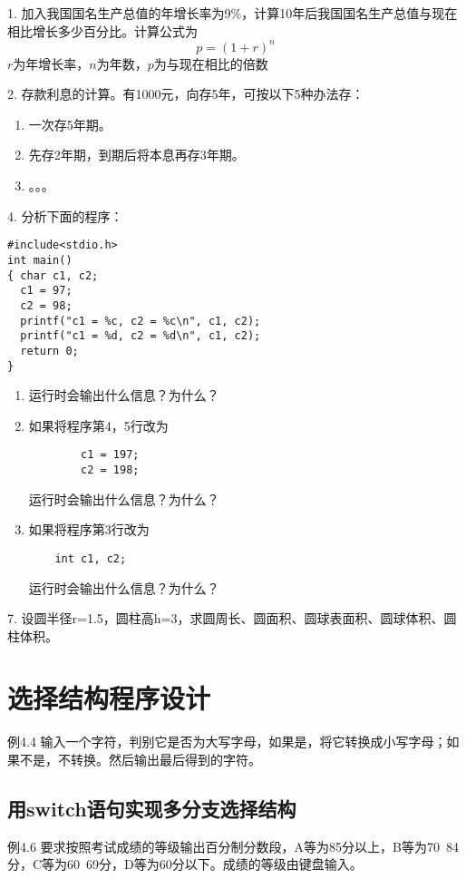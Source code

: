 1. 加入我国国名生产总值的年增长率为9\%，计算10年后我国国名生产总值与现在相比增长多少百分比。计算公式为
\begin{equation}
p = (1 + r) ^ n
\end{equation}
$r$为年增长率，$n$为年数，$p$为与现在相比的倍数

2. 存款利息的计算。有1000元，向存5年，可按以下5种办法存：
\begin{enumerate}
	\item 一次存5年期。
	\item 先存2年期，到期后将本息再存3年期。
	\item 。。。
\end{enumerate}

4. 分析下面的程序：
\begin{lstlisting}
#include<stdio.h>
int main()
{ char c1, c2;
  c1 = 97;
  c2 = 98;
  printf("c1 = %c, c2 = %c\n", c1, c2);
  printf("c1 = %d, c2 = %d\n", c1, c2);
  return 0;
}
\end{lstlisting}
\begin{enumerate}
	\item 运行时会输出什么信息？为什么？
	\item 如果将程序第4，5行改为
		\begin{lstlisting}
		c1 = 197;
		c2 = 198;
		\end{lstlisting}
运行时会输出什么信息？为什么？
	\item 如果将程序第3行改为
	\begin{lstlisting}
	int c1, c2;
	\end{lstlisting}
运行时会输出什么信息？为什么？
\end{enumerate}

7. 设圆半径r=1.5，圆柱高h=3，求圆周长、圆面积、圆球表面积、圆球体积、圆柱体积。

\chapter{选择结构程序设计}

例4.4 输入一个字符，判别它是否为大写字母，如果是，将它转换成小写字母；如果不是，不转换。然后输出最后得到的字符。

\section{用switch语句实现多分支选择结构}

例4.6 要求按照考试成绩的等级输出百分制分数段，A等为85分以上，B等为70~84分，C等为60~69分，D等为60分以下。成绩的等级由键盘输入。


